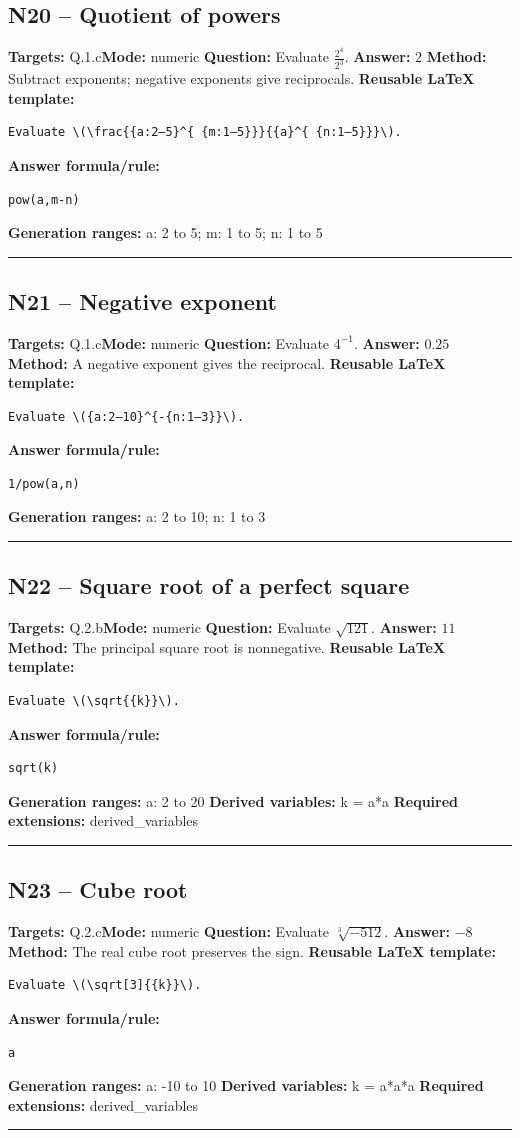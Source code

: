 \documentclass[11pt]{article}
\begin{document}
\subsection{N20 -- Quotient of powers}
\textbf{Targets:} Q.1.c\quad\textbf{Mode:} numeric
\textbf{Question:} Evaluate \(\frac{2^{ 4}}{2^{ 3}}\).
\textbf{Answer:} \(2\)
\textbf{Method:} Subtract exponents; negative exponents give reciprocals.
\textbf{Reusable LaTeX template:}
\begin{verbatim}
Evaluate \(\frac{{a:2–5}^{ {m:1–5}}}{{a}^{ {n:1–5}}}\).
\end{verbatim}
\textbf{Answer formula/rule:}
\begin{verbatim}
pow(a,m-n)
\end{verbatim}
\textbf{Generation ranges:} a: 2 to 5; m: 1 to 5; n: 1 to 5
\medskip\hrule\medskip
\subsection{N21 -- Negative exponent}
\textbf{Targets:} Q.1.c\quad\textbf{Mode:} numeric
\textbf{Question:} Evaluate \(4^{-1}\).
\textbf{Answer:} \(0.25\)
\textbf{Method:} A negative exponent gives the reciprocal.
\textbf{Reusable LaTeX template:}
\begin{verbatim}
Evaluate \({a:2–10}^{-{n:1–3}}\).
\end{verbatim}
\textbf{Answer formula/rule:}
\begin{verbatim}
1/pow(a,n)
\end{verbatim}
\textbf{Generation ranges:} a: 2 to 10; n: 1 to 3
\medskip\hrule\medskip
\subsection{N22 -- Square root of a perfect square}
\textbf{Targets:} Q.2.b\quad\textbf{Mode:} numeric
\textbf{Question:} Evaluate \(\sqrt{121}\).
\textbf{Answer:} \(11\)
\textbf{Method:} The principal square root is nonnegative.
\textbf{Reusable LaTeX template:}
\begin{verbatim}
Evaluate \(\sqrt{{k}}\).
\end{verbatim}
\textbf{Answer formula/rule:}
\begin{verbatim}
sqrt(k)
\end{verbatim}
\textbf{Generation ranges:} a: 2 to 20
\textbf{Derived variables:} k = a*a
\textbf{Required extensions:} derived\_variables
\medskip\hrule\medskip
\subsection{N23 -- Cube root}
\textbf{Targets:} Q.2.c\quad\textbf{Mode:} numeric
\textbf{Question:} Evaluate \(\sqrt[3]{-512}\).
\textbf{Answer:} \(-8\)
\textbf{Method:} The real cube root preserves the sign.
\textbf{Reusable LaTeX template:}
\begin{verbatim}
Evaluate \(\sqrt[3]{{k}}\).
\end{verbatim}
\textbf{Answer formula/rule:}
\begin{verbatim}
a
\end{verbatim}
\textbf{Generation ranges:} a: -10 to 10
\textbf{Derived variables:} k = a*a*a
\textbf{Required extensions:} derived\_variables
\medskip\hrule\medskip
\end{document}
